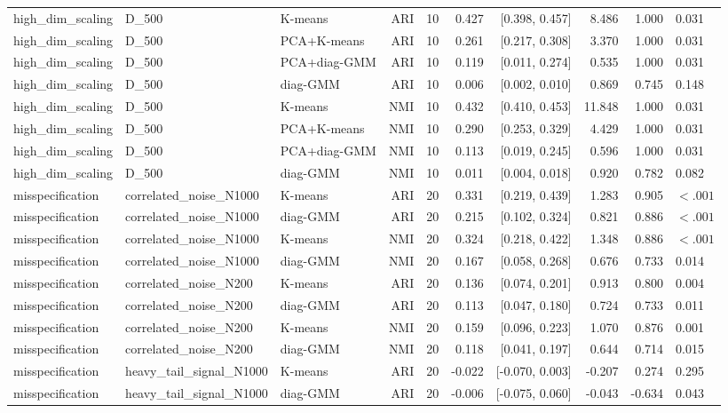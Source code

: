 \begin{table}[t]
\begin{tabular}{lllrrrrrr}
high\_dim\_scaling & D\_500 & K-means & ARI & 10 & 0.427 & [0.398, 0.457] & 8.486 & 1.000 & 0.031 \\
high\_dim\_scaling & D\_500 & PCA+K-means & ARI & 10 & 0.261 & [0.217, 0.308] & 3.370 & 1.000 & 0.031 \\
high\_dim\_scaling & D\_500 & PCA+diag-GMM & ARI & 10 & 0.119 & [0.011, 0.274] & 0.535 & 1.000 & 0.031 \\
high\_dim\_scaling & D\_500 & diag-GMM & ARI & 10 & 0.006 & [0.002, 0.010] & 0.869 & 0.745 & 0.148 \\
high\_dim\_scaling & D\_500 & K-means & NMI & 10 & 0.432 & [0.410, 0.453] & 11.848 & 1.000 & 0.031 \\
high\_dim\_scaling & D\_500 & PCA+K-means & NMI & 10 & 0.290 & [0.253, 0.329] & 4.429 & 1.000 & 0.031 \\
high\_dim\_scaling & D\_500 & PCA+diag-GMM & NMI & 10 & 0.113 & [0.019, 0.245] & 0.596 & 1.000 & 0.031 \\
high\_dim\_scaling & D\_500 & diag-GMM & NMI & 10 & 0.011 & [0.004, 0.018] & 0.920 & 0.782 & 0.082 \\
misspecification & correlated\_noise\_N1000 & K-means & ARI & 20 & 0.331 & [0.219, 0.439] & 1.283 & 0.905 & $<.001$ \\
misspecification & correlated\_noise\_N1000 & diag-GMM & ARI & 20 & 0.215 & [0.102, 0.324] & 0.821 & 0.886 & $<.001$ \\
misspecification & correlated\_noise\_N1000 & K-means & NMI & 20 & 0.324 & [0.218, 0.422] & 1.348 & 0.886 & $<.001$ \\
misspecification & correlated\_noise\_N1000 & diag-GMM & NMI & 20 & 0.167 & [0.058, 0.268] & 0.676 & 0.733 & 0.014 \\
misspecification & correlated\_noise\_N200 & K-means & ARI & 20 & 0.136 & [0.074, 0.201] & 0.913 & 0.800 & 0.004 \\
misspecification & correlated\_noise\_N200 & diag-GMM & ARI & 20 & 0.113 & [0.047, 0.180] & 0.724 & 0.733 & 0.011 \\
misspecification & correlated\_noise\_N200 & K-means & NMI & 20 & 0.159 & [0.096, 0.223] & 1.070 & 0.876 & 0.001 \\
misspecification & correlated\_noise\_N200 & diag-GMM & NMI & 20 & 0.118 & [0.041, 0.197] & 0.644 & 0.714 & 0.015 \\
misspecification & heavy\_tail\_signal\_N1000 & K-means & ARI & 20 & -0.022 & [-0.070, 0.003] & -0.207 & 0.274 & 0.295 \\
misspecification & heavy\_tail\_signal\_N1000 & diag-GMM & ARI & 20 & -0.006 & [-0.075, 0.060] & -0.043 & -0.634 & 0.043 \\

\end{tabular}
\end{table}

